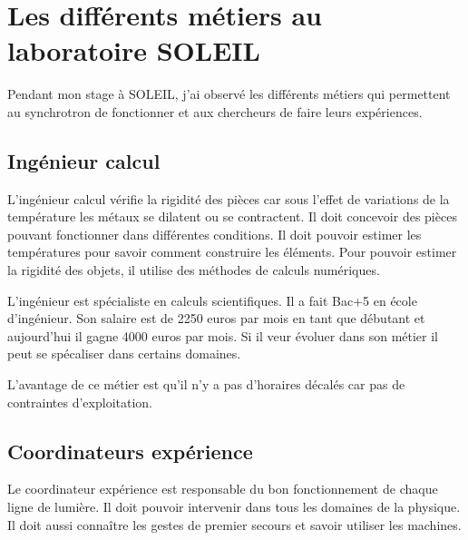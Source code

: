 
\chapter{Les différents métiers au laboratoire SOLEIL}
	\minitoc
	




			
	

		Pendant mon stage à SOLEIL, j'ai observé les différents métiers qui permettent au synchrotron de fonctionner et aux chercheurs de faire leurs expériences.			

		\section{Ingénieur calcul}
			L'ingénieur calcul vérifie la rigidité des pièces car sous l'effet de variations de la température les métaux se dilatent ou se contractent. Il doit concevoir des pièces pouvant fonctionner dans différentes conditions. Il doit pouvoir estimer les températures pour savoir comment construire les éléments. Pour pouvoir estimer la rigidité des objets, il utilise des méthodes de calculs numériques.
			
			L'ingénieur est spécialiste en calculs scientifiques. Il a fait Bac+5 en école d'ingénieur. Son salaire est de 2250 euros par mois en tant que débutant et aujourd'hui il gagne 4000 euros par mois. Si il veur évoluer dans son métier il peut se spécaliser dans certains domaines.
			
			L'avantage de ce métier est qu'il n'y a pas d'horaires décalés car pas de contraintes d'exploitation.  
		
		\section{Coordinateurs expérience}
			Le coordinateur expérience est responsable du bon fonctionnement de chaque ligne de lumière. Il doit pouvoir intervenir dans tous les domaines de la physique. Il doit aussi connaître les gestes de premier secours et savoir utiliser les machines.
			
